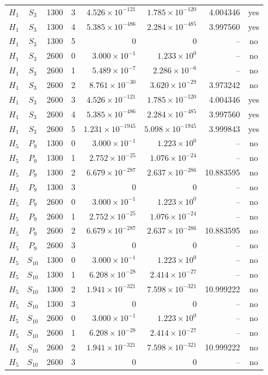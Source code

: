 \begin{longtable}{cccrrrrc}
$H_{1}$ & $S_{3}$ & 1300 & 3 & $4.526\times10^{-121}$ & $1.785\times10^{-120}$ & 4.004346 & yes\\
$H_{1}$ & $S_{3}$ & 1300 & 4 & $5.385\times10^{-486}$ & $2.284\times10^{-485}$ & 3.997560 & yes\\
$H_{1}$ & $S_{3}$ & 1300 & 5 & $0$ & $0$ & -- & no\\
$H_{1}$ & $S_{3}$ & 2600 & 0 & $3.000\times10^{-1}$ & $1.233\times10^{0}$ & -- & no\\
$H_{1}$ & $S_{3}$ & 2600 & 1 & $5.489\times10^{-7}$ & $2.286\times10^{-6}$ & -- & no\\
$H_{1}$ & $S_{3}$ & 2600 & 2 & $8.761\times10^{-30}$ & $3.620\times10^{-29}$ & 3.973242 & no\\
$H_{1}$ & $S_{3}$ & 2600 & 3 & $4.526\times10^{-121}$ & $1.785\times10^{-120}$ & 4.004346 & yes\\
$H_{1}$ & $S_{3}$ & 2600 & 4 & $5.385\times10^{-486}$ & $2.284\times10^{-485}$ & 3.997560 & yes\\
$H_{1}$ & $S_{3}$ & 2600 & 5 & $1.231\times10^{-1945}$ & $5.098\times10^{-1945}$ & 3.999843 & yes\\
$H_{5}$ & $P_{9}$ & 1300 & 0 & $3.000\times10^{-1}$ & $1.223\times10^{0}$ & -- & no\\
$H_{5}$ & $P_{9}$ & 1300 & 1 & $2.752\times10^{-25}$ & $1.076\times10^{-24}$ & -- & no\\
$H_{5}$ & $P_{9}$ & 1300 & 2 & $6.679\times10^{-287}$ & $2.637\times10^{-286}$ & 10.883595 & no\\
$H_{5}$ & $P_{9}$ & 1300 & 3 & $0$ & $0$ & -- & no\\
$H_{5}$ & $P_{9}$ & 2600 & 0 & $3.000\times10^{-1}$ & $1.223\times10^{0}$ & -- & no\\
$H_{5}$ & $P_{9}$ & 2600 & 1 & $2.752\times10^{-25}$ & $1.076\times10^{-24}$ & -- & no\\
$H_{5}$ & $P_{9}$ & 2600 & 2 & $6.679\times10^{-287}$ & $2.637\times10^{-286}$ & 10.883595 & no\\
$H_{5}$ & $P_{9}$ & 2600 & 3 & $0$ & $0$ & -- & no\\
$H_{5}$ & $S_{10}$ & 1300 & 0 & $3.000\times10^{-1}$ & $1.223\times10^{0}$ & -- & no\\
$H_{5}$ & $S_{10}$ & 1300 & 1 & $6.208\times10^{-28}$ & $2.414\times10^{-27}$ & -- & no\\
$H_{5}$ & $S_{10}$ & 1300 & 2 & $1.941\times10^{-321}$ & $7.598\times10^{-321}$ & 10.999222 & no\\
$H_{5}$ & $S_{10}$ & 1300 & 3 & $0$ & $0$ & -- & no\\
$H_{5}$ & $S_{10}$ & 2600 & 0 & $3.000\times10^{-1}$ & $1.223\times10^{0}$ & -- & no\\
$H_{5}$ & $S_{10}$ & 2600 & 1 & $6.208\times10^{-28}$ & $2.414\times10^{-27}$ & -- & no\\
$H_{5}$ & $S_{10}$ & 2600 & 2 & $1.941\times10^{-321}$ & $7.598\times10^{-321}$ & 10.999222 & no\\
$H_{5}$ & $S_{10}$ & 2600 & 3 & $0$ & $0$ & -- & no\\
\end{longtable}\endgroup
